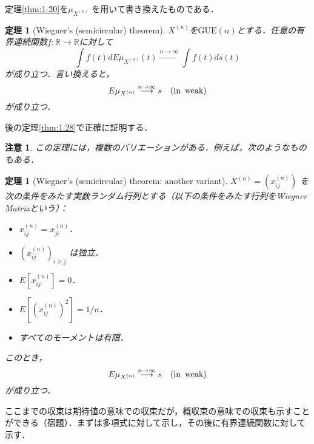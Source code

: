 \documentclass{ltjsarticle}
\makeatletter
\theoremstyle{mystyle1}
\newtheorem{thm}[dfn]{定理}
\theoremstyle{mystyle2}
\newtheorem{note*}{注意}
\theoremstyle{mystyle3}
\renewenvironment{proof}[1][\proofname]{\par
  \pushQED{\qed}%
  \normalfont
  \topsep6\p@\@plus6\p@ \trivlist
  \item[\hskip\labelsep{\bfseries\sffamily #1}]\ignorespaces
}{%
  \popQED\endtrivlist\@endpefalse
}
\renewcommand\proofname{証明}
\makeatother
\begin{document}
\begin{proof}
    定理\ref{thm:1-20}を$\mu_{X^{(n)}}$ を用いて書き換えたものである．
\end{proof}

\begin{thm}[Wiegner's (semicircular) theorem]\label{thm:1-25}
    $X^{(n)}$を$\mathrm{GUE}(n)$とする．任意の有界連続関数$f:\mathbb{R}\to\mathbb{R}$に対して
    \begin{equation}
        \int f(t)dE\mu_{X^{(n)}}(t)\overset{n\to\infty}{\longrightarrow}\int f(t)ds(t)
    \end{equation}
    が成り立つ．言い換えると，
    \begin{equation}
        E\mu_{X^{(n)}}\overset{n\to\infty}{\longrightarrow} s\quad(\textrm{in\, weak})
    \end{equation}
    が成り立つ．
\end{thm}

\begin{proof}
    後の定理\ref{thm:1.28}で正確に証明する．
\end{proof}

\begin{note*}
    この定理には，複数のバリエーションがある．例えば，次のようなものもある．
\end{note*}
\begin{thm}[Wiegner's (semicircular) theorem: another variant]
    $X^{(n)}=(x_{ij}^{(n)})$ を次の条件をみたす実数ランダム行列とする（以下の条件をみたす行列をWiegner Matrixという）：
    \begin{itemize}
        \item $x_{ij}^{(n)}=x_{ji}^{(n)}$．
        \item $(x_{ij}^{(n)})_{i\geq j}$ は独立．
        \item $E[x_{ij}^{(n)}]=0$．
        \item $E[(x_{ij}^{(n)})^2]=1/n$．
        \item すべてのモーメントは有限．
    \end{itemize}
    このとき，
    \begin{equation}
        E\mu_{X^{(n)}}\overset{n\to\infty}{\longrightarrow} s\quad(\textrm{in\, weak})
    \end{equation}
    が成り立つ．
\end{thm}

ここまでの収束は期待値の意味での収束だが，概収束の意味での収束も示すことができる（宿題）．まずは多項式に対して示し，その後に有界連続関数に対して示す．
\end{document}
